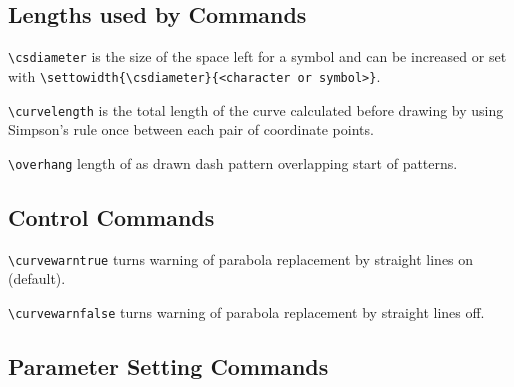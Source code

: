     \subsection{Lengths used by Commands} 
     \begin{hanging}

     \verb?\csdiameter? is the size of the space left for a symbol and can be
increased or set with \verb?\settowidth{\csdiameter}{<character or symbol>}?.

  \verb?\curvelength? is the total length of the curve calculated before
drawing by using Simpson's rule once between each pair of coordinate points.

\verb?\overhang? length of as drawn dash pattern overlapping start of
patterns.
      \end{hanging}
  \subsection{Control Commands} 
  \begin{hanging}
  \verb?\curvewarntrue? turns warning of parabola replacement by straight 
lines on (default). 
  
  \verb?\curvewarnfalse? turns warning of parabola replacement by straight 
lines off.  
  \end{hanging} 
    \subsection{Parameter Setting Commands} 

